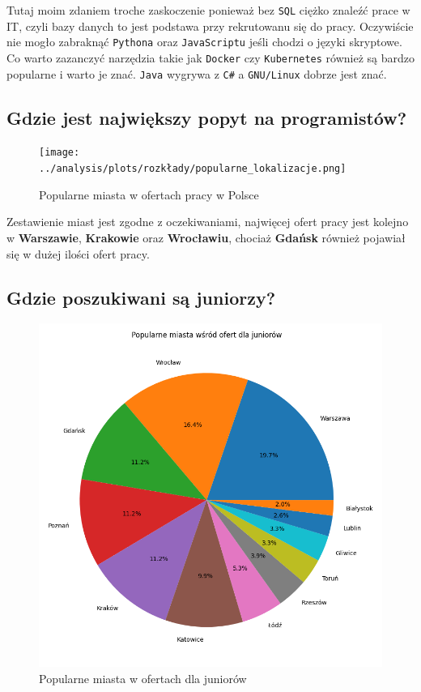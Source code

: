 \documentclass[a4paper]{article}
\begin{document}
\quad Tutaj moim zdaniem troche zaskoczenie ponieważ bez \texttt{SQL} ciężko znaleźć prace w IT, czyli
bazy danych to jest podstawa przy rekrutowanu się do pracy. Oczywiście nie mogło zabraknąć \texttt{Pythona} oraz \texttt{JavaScriptu} jeśli chodzi o języki skryptowe.
Co warto zazanczyć narzędzia takie jak \texttt{Docker} czy \texttt{Kubernetes} również są bardzo popularne i warto je znać. \texttt{Java} wygrywa z \texttt{C\#} a \texttt{GNU/Linux} dobrze jest znać.


\subsection{Gdzie jest największy popyt na programistów?}

\begin{figure}[H]
    \centering
    \texttt{[image: ../analysis/plots/rozkłady/popularne\_lokalizacje.png]}
    \caption{Popularne miasta w ofertach pracy w Polsce}
\end{figure}

\quad Zestawienie miast jest zgodne z oczekiwaniami, najwięcej ofert pracy jest kolejno w \textbf{Warszawie}, \textbf{Krakowie} oraz \textbf{Wrocławiu}, chociaż
\textbf{Gdańsk} również pojawiał się w dużej ilości ofert pracy.


\subsection{Gdzie poszukiwani są juniorzy?}

\begin{figure}[H]
    \centering
    \includegraphics[width=\textwidth]{../analysis/plots/rozkłady/popularne_miasta_wśród_ofert_dla_juniorów.png}
    \caption{Popularne miasta w ofertach dla juniorów}
\end{figure}
\end{document}
